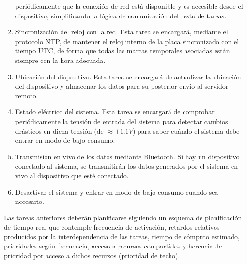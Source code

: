 \begin{enumerate}
        periódicamente que la conexión de red está disponible y es accesible desde
        el dispositivo, simplificando la lógica de comunicación del resto de tareas.
  \item Sincronización del reloj con la red. Esta tarea se encargará, mediante el
        protocolo \ac{NTP}, de mantener el reloj interno de la placa sincronizado con el
        tiempo \ac{UTC}, de forma que todas las marcas temporales asociadas están siempre
        con la hora adecuada.
  \item Ubicación del dispositivo. Esta tarea se encargará de actualizar la ubicación
        del dispositivo y almacenar los datos para su posterior envío al servidor remoto.
  \item Estado eléctrico del sistema. Esta tarea se encargará de comprobar periódicamente
        la tensión de entrada del sistema para detectar cambios drásticos en dicha
        tensión (de $\approx \pm 1.1V$) para saber cuándo el sistema debe entrar en
        modo de bajo consumo.
  \item Transmisión en vivo de los datos mediante Bluetooth. Si hay un dispositivo
        conectado al sistema, se transmitirán los datos generados por el sistema
        en vivo al dispositivo que esté conectado.
  \item Desactivar el sistema y entrar en modo de bajo consumo cuando sea necesario.
\end{enumerate}

Las tareas anteriores deberán planificarse siguiendo un esquema de planificación de
tiempo real que contemple frecuencia de activación, retardos relativos producidos
por la interdependencia de las tareas, tiempo de cómputo estimado, prioridades
según frecuencia, acceso a recursos compartidos y herencia de prioridad por acceso
a dichos recursos (prioridad de techo).
